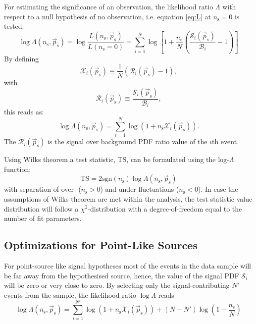 \documentclass{article}
\newcommand{\ns}{n_{\mathrm{s}}}
\newcommand{\ps}{\vec{p}_{\mathrm{s}}}
\begin{document}
For estimating the significance of an observation, the likelihood ratio
$\Lambda$ with respect to a null hypothesis of no observation, i.e.
equation \ref{eq:L} at $\ns=0$ is tested:
\begin{equation}
 \log \Lambda(\ns,\ps) = \log \frac{L(\ns,\ps)}{L(\ns=0)} = \sum_{i=1}^{N} \log \left[ 1 + \frac{\ns}{N}\left( \frac{\mathcal{S}_i(\ps)}{\mathcal{B}_i} - 1 \right) \right]
\label{eq:logLambda}
\end{equation}
By defining
\begin{equation}
\mathcal{X}_i(\ps) \equiv \frac{1}{N}\left( \mathcal{R}_i(\ps) - 1 \right),
\label{eq:Xi}
\end{equation}
with
\begin{equation}
 \mathcal{R}_i(\ps) \equiv \frac{\mathcal{S}_i(\ps)}{\mathcal{B}_i},
\end{equation}
this reads as:
\begin{equation}
 \log \Lambda(\ns,\ps) = \sum_{i=1}^{N} \log (1 + \ns\mathcal{X}_i(\ps)).
 \label{eq:logLambdaOfX}
\end{equation}
The $\mathcal{R}_{i}(\ps)$ is the signal over background PDF ratio value of the
$i$th event.

Using Wilks theorem a test statistic, TS, can be formulated using the
log-$\Lambda$ function:
\begin{equation}
 \mathrm{TS} = 2\mathrm{sgn}(\ns) \log \Lambda(\ns,\ps)
 \label{eq:TS}
\end{equation}
with separation of over- ($\ns > 0$) and under-fluctuations ($\ns < 0$).
In case the assumptions of Wilks theorem are met within the analysis, the test
statistic value distribution will follow a $\chi^2$-distribution with
a degree-of-freedom equal to the number of fit parameters.

\subsection{Optimizations for Point-Like Sources}

For point-source like signal hypotheses most of the events in the data sample
will be far away from the hypothesised source, hence, the value of the
signal PDF $\mathcal{S}_i$ will be zero or very close to zero. By selecting only
the signal-contributing $N'$ events from the sample, the likelihood ratio
$\log \Lambda$ reads
\begin{equation}
 \log \Lambda(\ns,\ps) = \sum_{i=1}^{N'} \log(1 + \ns\mathcal{X}_i(\ps)) + (N - N')\log(1 - \frac{\ns}{N})
 \label{eq:logLambdaOfXOptimized}
\end{equation}
\end{document}
